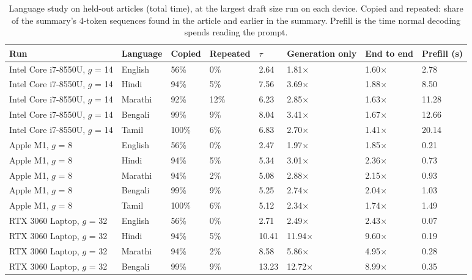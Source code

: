 \documentclass[11pt,a4paper]{article}
\begin{document}
\begin{table}[tbp]
\centering
\small
\caption{Language study on held-out articles (total time), at the largest draft size run on each device. Copied and repeated: share of the summary's 4-token sequences found in the article and earlier in the summary. Prefill is the time normal decoding spends reading the prompt.}
\setlength{\tabcolsep}{4pt}
\begin{tabular}{L{2.76cm}L{1.65cm}L{1.38cm}L{1.65cm}L{1.01cm}L{2.11cm}L{1.75cm}L{1.56cm}}
\toprule
\textbf{Run} & \textbf{Language} & \textbf{Copied} & \textbf{Repeated} & \textbf{$\tau$} & \textbf{Generation only} & \textbf{End to end} & \textbf{Prefill (s)} \\
\midrule
Intel Core i7-8550U, $g$ = 14 & English & 56\% & 0\% & 2.64 & 1.81$\times$ & 1.60$\times$ & 2.78 \\
Intel Core i7-8550U, $g$ = 14 & Hindi & 94\% & 5\% & 7.56 & 3.69$\times$ & 1.88$\times$ & 8.50 \\
Intel Core i7-8550U, $g$ = 14 & Marathi & 92\% & 12\% & 6.23 & 2.85$\times$ & 1.63$\times$ & 11.28 \\
Intel Core i7-8550U, $g$ = 14 & Bengali & 99\% & 9\% & 8.04 & 3.41$\times$ & 1.67$\times$ & 12.66 \\
Intel Core i7-8550U, $g$ = 14 & Tamil & 100\% & 6\% & 6.83 & 2.70$\times$ & 1.41$\times$ & 20.14 \\
Apple M1, $g$ = 8 & English & 56\% & 0\% & 2.47 & 1.97$\times$ & 1.85$\times$ & 0.21 \\
Apple M1, $g$ = 8 & Hindi & 94\% & 5\% & 5.34 & 3.01$\times$ & 2.36$\times$ & 0.73 \\
Apple M1, $g$ = 8 & Marathi & 94\% & 2\% & 5.08 & 2.88$\times$ & 2.15$\times$ & 0.93 \\
Apple M1, $g$ = 8 & Bengali & 99\% & 9\% & 5.25 & 2.74$\times$ & 2.04$\times$ & 1.03 \\
Apple M1, $g$ = 8 & Tamil & 100\% & 6\% & 5.12 & 2.34$\times$ & 1.74$\times$ & 1.49 \\
RTX 3060 Laptop, $g$ = 32 & English & 56\% & 0\% & 2.71 & 2.49$\times$ & 2.43$\times$ & 0.07 \\
RTX 3060 Laptop, $g$ = 32 & Hindi & 94\% & 5\% & 10.41 & 11.94$\times$ & 9.60$\times$ & 0.19 \\
RTX 3060 Laptop, $g$ = 32 & Marathi & 94\% & 2\% & 8.58 & 5.86$\times$ & 4.95$\times$ & 0.28 \\
RTX 3060 Laptop, $g$ = 32 & Bengali & 99\% & 9\% & 13.23 & 12.72$\times$ & 8.99$\times$ & 0.35 \\

\end{tabular}
\end{table}
\end{document}
